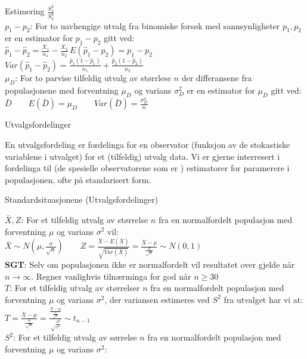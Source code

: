 \documentclass[final,hyperref={pdfpagelabels=false}]{beamer}
\begin{document}
\begin{frame}{}
\begin{columns}[t]
\begin{column}{.25\linewidth}
\begin{block}{\center\normalsize Estimering}
{					$\frac{S_1^2}{S_2^2}$\\
					$p_1-p_2$: For to uavhengige utvalg fra binomiske forsøk med sannsynligheter $p_1,p_2$ er en estimator for $p_1-p_2$ gitt ved:\\
					$\hat p_1 - \hat p_2 = \frac{X_1}{n_1}-\frac{X_2}{n_2}\,E(\hat p_1 - \hat p_2)=p_1-p_2\,$\\
					$Var(\hat p_1 - \hat p_2)=\frac{\hat p_1 (1 - \hat p_1)}{n_1} + \frac{\hat p_2 (1 - \hat p_2)}{n_2}$\\
					$\mu_D$: For to parvise tilfeldig utvalg av størrlese $n$ der differansene fra populasjonene med forventning $\mu_D$ og varians $\sigma_D^2$ er en estimator for $\mu_D$ gitt ved: \\
					$\bar D \qquad E(\bar D)=\mu_D \qquad Var(\bar D)=\frac{\sigma_D^2}{n}$
				}
			\end{block}
			\begin{block}{\center\normalsize Utvalgsfordelinger}
				{\footnotesize\raggedright
					En utvalgsfordeling er fordelinga for en observator (funksjon av de stokastiske variablene i utvalget) for et (tilfeldig) utvalg data. Vi er gjerne interresert i fordelinga til (de spesielle observatorene som er ) estimatorer for paramerere i populasjonen, ofte på standarisert form.
				}
				\center\normalsize Standardsituasjonene (Utvalgsfordelinger)\\
				{\footnotesize\raggedright
					$\bar X, Z$: For et tilfeldig utvalg av størrelse $n$ fra en normalfordelt populasjon med forventning $\mu$ og varians $\sigma^2$ vil:\\
					$\bar X \sim N \left( \mu, \frac{\sigma}{ \sqrt n} \right) \qquad Z=\frac{\bar{X}-E(\bar X)}{\sqrt{Var(\bar X)}}=\frac{\bar X - \mu}{\frac{\sigma}{\sqrt{n}}}\sim N(0,1)$\\
					\textbf{SGT}: Selv om populasjonen ikke er normalfordelt vil resultatet over gjelde når $n \rightarrow \infty$. Regner vanlighvis tilnærminga for god når $n\geq 30$\\
					$T$: For et tilfeldig utvalg av størrelser $n$ fra en normalfordelt populasjon med forventning $\mu$ og varians $\sigma^2$, der variansen estimeres ved $S^2$ fra utvalget har vi at:\\
					$T=\frac{\bar X - \mu}{\frac{S}{\sqrt n}}=\frac{\frac{\bar X - \mu}{\frac{\sigma}{\sqrt n}}}{\sqrt \frac{S^2}{\sigma^2}}\sim t_{n-1}$\\
					$S^2$: For et tilfeldig utvalg av sørrelse $n$ fra en normalfordelt populasjon med forventning $\mu$ og varians $\sigma^2$:\\
}
\end{block}
\end{column}
\end{columns}
\end{frame}
\end{document}
